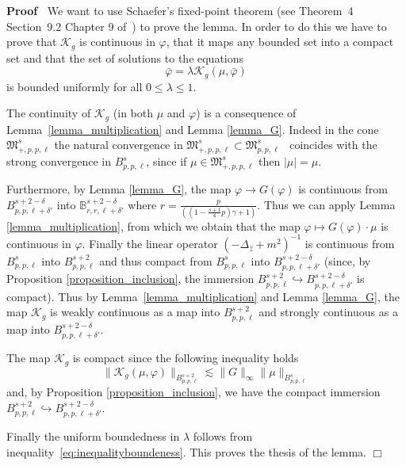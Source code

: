 \documentclass[a4paper,10pt]{article}
\newenvironment{proof}{\noindent\textbf{Proof\ }}{\hspace*{\fill}$\Box$\medskip}
\begin{document}
\begin{proof}
  We want to use Schaefer's fixed-point theorem (see Theorem~4 Section~9.2
  Chapter 9 of~{\cite{Evans1998}}) to prove the lemma. In order to do this we
  have to prove that $\mathcal{K}_g$ is continuous in $\varphi$, that it maps
  any bounded set into a compact set and that the set of solutions to the
  equations
  \[ \bar{\varphi} = \lambda \mathcal{K}_g (\mu, \bar{\varphi}) \]
  is bounded uniformly for all $0 \leqslant \lambda \leqslant 1$.
  
  The continuity of $\mathcal{K}_g$ (in both $\mu$ and $\varphi$) is a
  consequence of Lemma~\ref{lemma_multiplication} and Lemma \ref{lemma_G}.
  Indeed in the cone $\mathfrak{M}^s_{+, p, p, \ell}$ the natural convergence
  in $\mathfrak{M}^s_{+, p, p, \ell} \subset \mathfrak{M}^s_{p, p, \ell}$ \
  coincides with the strong convergence in $B^s_{p, p, \ell}$, since if $\mu
  \in \mathfrak{M}^s_{+, p, p, \ell}$ then $| \mu | = \mu$.
  
  Furthermore, by Lemma \ref{lemma_G}, the map $\varphi \rightarrow G
  (\varphi)$ is continuous from $B^{s + 2 - \delta}_{p, p, \ell + \delta'}$
  into $\mathbb{B}^{s + 2 - \delta}_{r, r, \ell + \delta'}$ where $r =
  \frac{p}{\left( \left( 1 - \frac{s + 1}{4} p \right) \gamma + 1 \right)}$.
  Thus we can apply Lemma \ref{lemma_multiplication}, from which we obtain
  that the map $\varphi \longmapsto G (\varphi) \cdot \mu$ is continuous in
  $\varphi$. Finally the linear operator $(- \Delta_{\hat{z}} + m^2)^{- 1}$ is
  continuous from $B^s_{p, p, \ell}$ into $B^{s + 2}_{p, p, \ell}$ and thus
  compact from $B^s_{p, p, \ell}$ into $B^{s + 2 - \delta}_{p, p, \ell +
  \delta'}$ (since, by Proposition \ref{proposition_inclusion}, the immersion
  $B^{s + 2}_{p, p, \ell} \hookrightarrow B^{s + 2 - \delta}_{p, p, \ell +
  \delta'}$ is compact). Thus by Lemma~\ref{lemma_multiplication} and Lemma
  \ref{lemma_G}, the map $\mathcal{K}_g$ is weakly continuous as a map into
  $B^{s + 2}_{p, p, \ell}$ and strongly continuous as a map into $B^{s + 2 -
  \delta}_{p, p, \ell + \delta'}$.
  
  The map $\mathcal{K}_g$ is compact since the following inequality holds
  \begin{equation}
    \| \mathcal{K}_g (\mu, \varphi) \|_{B^{s + 2}_{p, p, \ell}} \lesssim \| G
    \|_{\infty} \| \mu \|_{B^s_{p, p, \ell}} \label{eq:inequalityboundeness}
  \end{equation}
  and, by Proposition \ref{proposition_inclusion}, we have the compact
  immersion $B^{s + 2}_{p, p, \ell} \hookrightarrow B^{s + 2 - \delta}_{p, p,
  \ell + \delta'}$.
  
  Finally the uniform boundedness in $\lambda$ follows from
  inequality~{\eqref{eq:inequalityboundeness}}. This proves the thesis of the
  lemma.
\end{proof}
\end{document}
